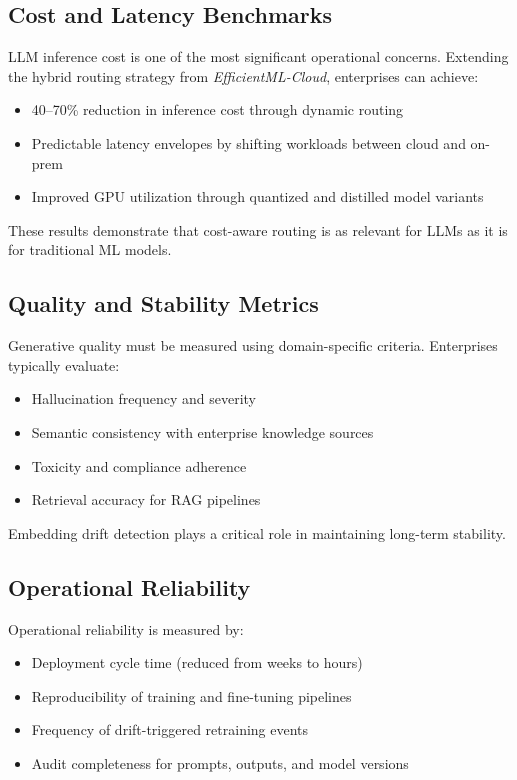 \documentclass[11pt]{article}
\begin{document}
\subsection{Cost and Latency Benchmarks}

LLM inference cost is one of the most significant operational concerns. Extending the hybrid routing strategy from \textit{EfficientML-Cloud}, enterprises can achieve:

\begin{itemize}[leftmargin=1.2cm]
    \item 40--70\% reduction in inference cost through dynamic routing
    \item Predictable latency envelopes by shifting workloads between cloud and on-prem
    \item Improved GPU utilization through quantized and distilled model variants
\end{itemize}

These results demonstrate that cost-aware routing is as relevant for LLMs as it is for traditional ML models.

\subsection{Quality and Stability Metrics}

Generative quality must be measured using domain-specific criteria. Enterprises typically evaluate:

\begin{itemize}[leftmargin=1.2cm]
    \item Hallucination frequency and severity
    \item Semantic consistency with enterprise knowledge sources
    \item Toxicity and compliance adherence
    \item Retrieval accuracy for RAG pipelines
\end{itemize}

Embedding drift detection plays a critical role in maintaining long-term stability.

\subsection{Operational Reliability}

Operational reliability is measured by:

\begin{itemize}[leftmargin=1.2cm]
    \item Deployment cycle time (reduced from weeks to hours)
    \item Reproducibility of training and fine-tuning pipelines
    \item Frequency of drift-triggered retraining events
    \item Audit completeness for prompts, outputs, and model versions
\end{itemize}
\end{document}
